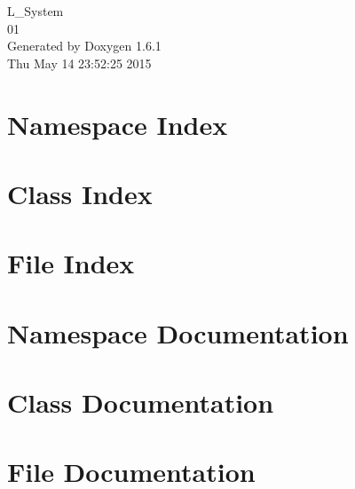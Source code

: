 \documentclass[a4paper]{book}
\begin{document}
\hypersetup{pageanchor=false}
\begin{titlepage}
\vspace*{7cm}
\begin{center}
{\Large L\_\-System \\[1ex]\large 01 }\\
\vspace*{1cm}
{\large Generated by Doxygen 1.6.1}\\
\vspace*{0.5cm}
{\small Thu May 14 23:52:25 2015}\\
\end{center}
\end{titlepage}
\clearemptydoublepage
{}
\tableofcontents
\clearemptydoublepage
{}
\hypersetup{pageanchor=true}
\chapter{Namespace Index}

\chapter{Class Index}

\chapter{File Index}

\chapter{Namespace Documentation}

\chapter{Class Documentation}















\chapter{File Documentation}















\printindex
\end{document}
